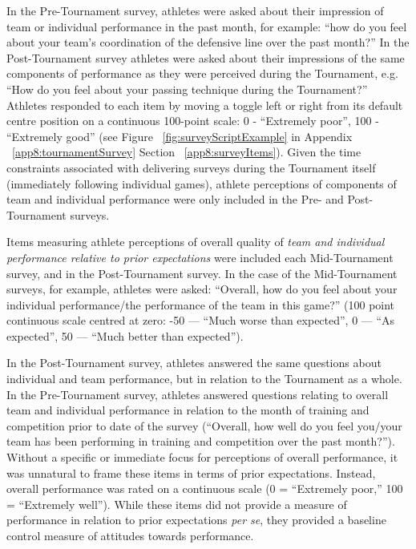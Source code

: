 \begin{CJK}{UTF8}{gbsn}
In the Pre-Tournament survey, athletes were asked about their impression of team or individual performance in the past month, for example: ``how do you feel about your team's coordination of the defensive line over the past month?''  In the Post-Tournament survey athletes were asked about their impressions of the same components of performance as they were perceived during the Tournament, e.g. ``How do you feel about your passing technique during the Tournament?'' Athletes responded to each item by moving a toggle left or right from its default centre position on a continuous 100-point scale: 0 - ``Extremely poor'', 100 - ``Extremely good'' (see Figure ~\ref{fig:surveyScriptExample} in Appendix ~\ref{app8:tournamentSurvey} Section ~\ref{app8:surveyItems}).  Given the time constraints associated with delivering surveys during the Tournament itself (immediately following individual games), athlete perceptions of components of team and individual performance were only included in the Pre- and Post-Tournament surveys.

Items measuring athlete perceptions of overall quality of \textit{team and individual performance relative to prior expectations} were included each Mid-Tournament survey, and in the Post-Tournament survey.  In the case of the Mid-Tournament surveys, for example, athletes were asked: ``Overall, how do you feel about your individual performance/the performance of the team in this game?'' (100 point continuous scale centred at zero: -50 --- ``Much worse than expected'', 0 --- ``As expected'', 50 ---  ``Much better than expected'').

In the Post-Tournament survey, athletes answered the same questions about individual and team performance, but in relation to the Tournament as a whole.  In the Pre-Tournament survey, athletes answered questions relating to overall team and individual performance in relation to the month of training and competition prior to date of the survey (``Overall, how well do you feel you/your team has been performing in training and competition over the past month?'').
Without a specific or immediate focus for perceptions of overall performance, it was unnatural to frame these items in terms of prior expectations.  Instead, overall performance was rated on a continuous scale (0 = ``Extremely poor,'' 100 = ``Extremely well'').  While these items did not provide a measure of performance in relation to prior expectations \textit{per se}, they provided a baseline control measure of attitudes towards performance.


\end{CJK}
